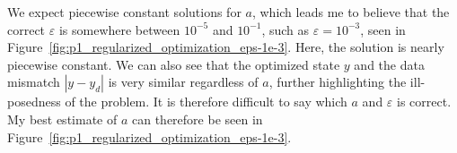 We expect piecewise constant solutions for $a$, which leads me to believe that the correct $\varepsilon$ is somewhere between $10^{-5}$ and $10^{-1}$, such as $\varepsilon=10^{-3}$, seen in Figure~\ref{fig:p1_regularized_optimization_eps-1e-3}. Here, the solution is nearly piecewise constant. We can also see that the optimized state $y$ and the data mismatch $|y-y_d|$ is very similar regardless of $a$, further highlighting the ill-posedness of the problem. It is therefore difficult to say which $a$ and $\varepsilon$ is correct. My best estimate of $a$ can therefore be seen in Figure~\ref{fig:p1_regularized_optimization_eps-1e-3}.






